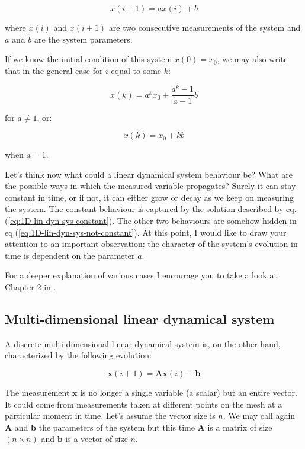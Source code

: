 \documentclass[10pt,twocolumn]{article}
\begin{document}
\begin{equation}
x(i+1) = a x(i) + b
\end{equation}

where $x(i)$ and $x(i+1)$ are two consecutive measurements of the system and $a$ and $b$ are the system parameters.

If we know the initial condition of this system $x(0) = x_0$, we may also write that in the general case for $i$ equal to some $k$:

\begin{equation} \label{eq:1D-lin-dyn-sys-not-constant}
x(k) = a^k x_0 + \frac{a^k - 1}{a - 1} b
\end{equation}

for $a \neq 1$, or:

\begin{equation} \label{eq:1D-lin-dyn-sys-constant}
x(k) = x_0 + k b
\end{equation}

when $a = 1$.

Let's think now what could a linear dynamical system behaviour be? What are the possible ways in which the measured variable propagates? Surely it can stay constant in time, or if not, it can either grow or decay as we keep on measuring the system. The constant behaviour is captured by the solution described by eq.(\ref{eq:1D-lin-dyn-sys-constant}). The other two behaviours are somehow hidden in eq.(\ref{eq:1D-lin-dyn-sys-not-constant}). At this point, I would like to draw your attention to an important observation: the character of the system's evolution in time is dependent on the parameter $a$.

For a deeper explanation of various cases I encourage you to take a look at Chapter 2 in \cite{Prof_Edward_Scheinerman}.

\subsection{Multi-dimensional linear dynamical system}

A discrete multi-dimensional linear dynamical system is, on the other hand, characterized by the following evolution:

\begin{equation}
\mathbf{x}(i+1) = \mathbf{A} \mathbf{x}(i) + \mathbf{b}
\end{equation}

The measurement $\mathbf{x}$ is no longer a single variable (a scalar) but an entire vector. It could come from measurements taken at different points on the mesh at a particular moment in time. Let's assume the vector size is $n$. We may call again $\mathbf{A}$ and $\mathbf{b}$ the parameters of the system but this time $\mathbf{A}$ is a matrix of size $(n \times n)$ and $\mathbf{b}$ is a vector of size $n$.
\end{document}
